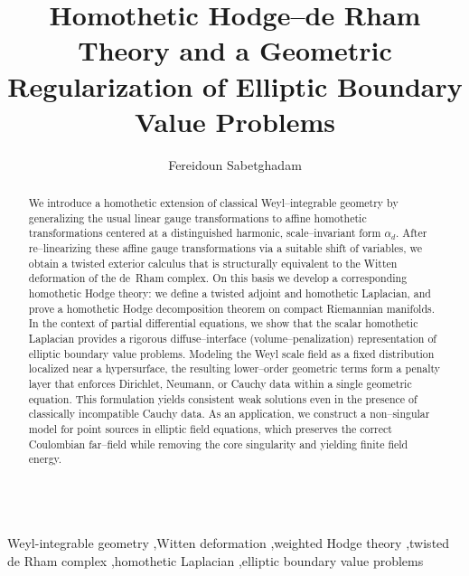 \documentclass[preprint,12pt]{elsarticle}
\theoremstyle{plain}
\theoremstyle{definition}
\theoremstyle{note}
\begin{document}
\begin{frontmatter}

\title{Homothetic Hodge–de Rham Theory and a Geometric Regularization of Elliptic Boundary Value Problems}

\author{Fereidoun Sabetghadam}
\address{%
  \textit{Mechanical Engineering Faculty, Science and Research Branch, IAU, Tehran, Iran}\\
  \textit{Email: fsabet@srbiau.ac.ir}
}

\begin{abstract}
We introduce a homothetic extension of classical Weyl–integrable geometry by generalizing the usual linear gauge transformations to affine homothetic transformations centered at a distinguished harmonic, scale–invariant form $\alpha_d$. After re–linearizing these affine gauge transformations via a suitable shift of variables, we obtain a twisted exterior calculus that is
structurally equivalent to the Witten deformation of the de~Rham complex. On this basis we develop a corresponding homothetic Hodge theory: we define a twisted adjoint and homothetic Laplacian, and prove a homothetic Hodge decomposition theorem on compact Riemannian manifolds. In the context of partial differential equations, we show that the scalar homothetic Laplacian provides a rigorous diffuse–interface (volume–penalization) representation of elliptic boundary value problems. Modeling the Weyl scale field as a fixed distribution localized near a hypersurface, the resulting
lower–order geometric terms form a penalty layer that enforces Dirichlet, Neumann, or Cauchy data within a single geometric equation. This formulation yields consistent weak solutions even in the presence of classically incompatible Cauchy data. As an application, we construct a non–singular model for point sources in elliptic field equations, which preserves the correct Coulombian far–field while removing the core singularity and yielding finite field energy.
\end{abstract}

\begin{keyword}
\\
Weyl-integrable geometry \sep Witten deformation \sep weighted Hodge theory \sep twisted de Rham complex \sep homothetic Laplacian \sep elliptic boundary value problems
\end{keyword}



\end{frontmatter}
\end{document}
